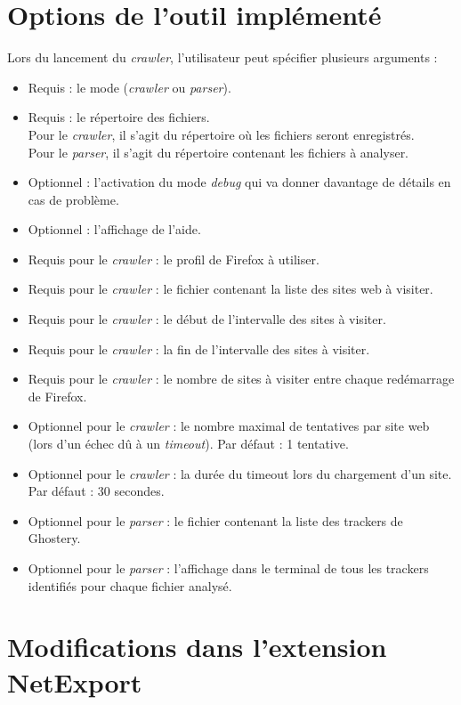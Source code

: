\appendix
\chapter{Options de l'outil implémenté}
\label{options_outil_implémenté}
Lors du lancement du \textit{crawler}, l'utilisateur peut spécifier plusieurs arguments :
\begin{itemize}
	\item Requis : le mode (\textit{crawler} ou \textit{parser}).
	\item Requis : le répertoire des fichiers.\\
		Pour le \textit{crawler}, il s'agit du répertoire où les fichiers seront enregistrés.\\
		Pour le \textit{parser}, il s'agit du répertoire contenant les fichiers à analyser.
	\item Optionnel : l'activation du mode \textit{debug} qui va donner davantage de détails en cas de problème.
	\item Optionnel : l'affichage de l'aide.
	\newline
	\item Requis pour le \textit{crawler} : le profil de Firefox à utiliser.
	\item Requis pour le \textit{crawler} : le fichier contenant la liste des sites web à visiter.
	\item Requis pour le \textit{crawler} : le début de l'intervalle des sites à visiter.
	\item Requis pour le \textit{crawler} : la fin de l'intervalle des sites à visiter.
	\item Requis pour le \textit{crawler} : le nombre de sites à visiter entre chaque redémarrage de Firefox.
	\item Optionnel pour le \textit{crawler} : le nombre maximal de tentatives par site web (lors d'un échec dû à un \textit{timeout}). Par défaut : 1 tentative.
	\item Optionnel pour le \textit{crawler} : la durée du timeout lors du chargement d'un site. Par défaut : 30 secondes.
	\newline
	\item Optionnel pour le \textit{parser} : le fichier contenant la liste des trackers de Ghostery.
	\item Optionnel pour le \textit{parser} : l'affichage dans le terminal de tous les trackers identifiés pour chaque fichier analysé.
\end{itemize}

\chapter{Modifications dans l'extension NetExport}
\label{modifications_extensions}
